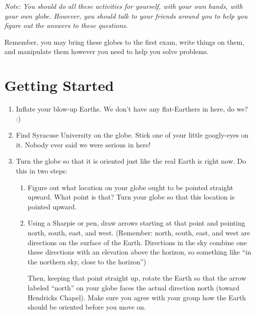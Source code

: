\documentclass[12pt]{article}
\begin{document}
\Large
\centerline{}

\normalsize

{\it Note: You should do all these activities for yourself, with your own hands, with your own globe. However, you should 
talk to your friends around you to help you figure out the answers to these questions. 

Remember, you may bring 
these globes to the first exam, write things on them, and manipulate them however you need to help you solve problems.}


\section{Getting Started}
\begin{enumerate}

\item Inflate your blow-up Earths. We don't have any flat-Earthers in here, do we? :)

\item Find Syracuse University on the globe. Stick one of your little googly-eyes on it. Nobody ever said we were serious in 
here!

\item Turn the globe so that it is oriented just like the real Earth is right now. Do this in two steps:

\begin{enumerate}

\item Figure out what location on your globe ought to be pointed straight upward. What point is that? Turn your globe
so that this location is pointed upward.

\vspace{1in}

\item {Using a Sharpie or pen, draw arrows starting at that point and pointing north, south, east, and west. (Remember: north, 
south, east, and west are directions on the surface of the Earth. Directions in the sky combine one these directions with
an elevation above the horizon, so something like ``in the northern sky, close to the horizon'') 

\medskip

Then, keeping that point straight up, rotate the Earth so that the arrow labeled ``north'' on your globe faces 
the actual direction north (toward Hendricks Chapel). Make sure you agree with your group how the Earth should be oriented
before you move on.
}

\end{enumerate}
\end{enumerate}
\end{document}
